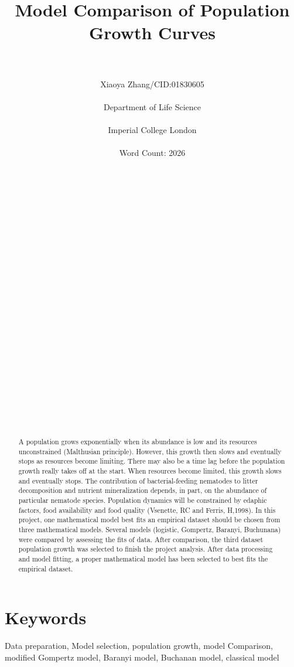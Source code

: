 \documentclass[11pt]{article}
\title{Model Comparison of Population Growth Curves\\}
\author{\\\\Xiaoya Zhang/CID:01830605\\\\Department of Life Science\\\\Imperial College London\\\\Word Count: 2026\\\\\\\\\\\\\\\\\\\\\\\\\\\\\\\\\\\\\\\\\\\\\\\\}
\date{}
\begin{document}
  \maketitle
  
  \begin{abstract}
  A population grows exponentially when its abundance is low and its resources unconstrained (Malthusian principle). However, this growth then slows and eventually stops as resources become limiting. There may also be a time lag before the population growth really takes off at the start. When resources become limited, this growth slows and eventually stops. The contribution of bacterial-feeding nematodes to litter decomposition and nutrient mineralization depends, in part, on the abundance of particular nematode species. Population dynamics will be constrained by edaphic factors, food availability and food quality (Vsenette, RC and Ferris, H,1998). In this project, one mathematical model best fits an empirical dataset should be chosen from three mathematical models. Several models (logistic, Gompertz, Baranyi, Buchunana) were compared by assessing the fits of data. After comparison, the third dataset population growth was selected to finish the project analysis. After data processing and model fitting, a proper mathematical model has been selected to best fits the empirical dataset.
  \end{abstract}
  \section{Keywords}
  Data preparation, Model selection, population growth, model Comparison, modified Gompertz model, Baranyi model, Buchanan model, classical model

  
\end{document}
